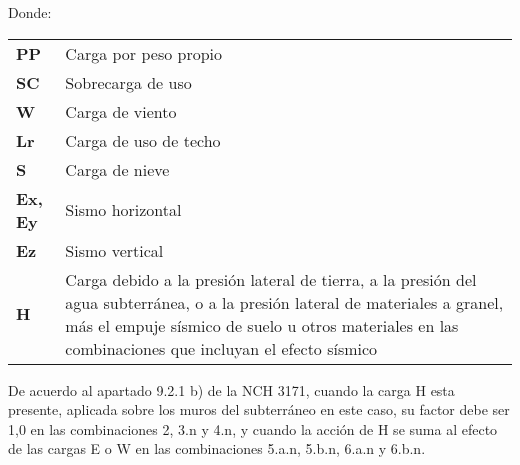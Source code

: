  
Donde:

\begin{table}[H]
  \centering
    \begin{tabular}{lp{12cm}}
    \textbf{PP} & Carga por peso propio \\
    \textbf{SC} & Sobrecarga de uso \\
    \textbf{W} & Carga de viento \\
    \textbf{Lr} & Carga de uso de techo \\
    \textbf{S} & Carga de nieve \\
    \textbf{Ex, Ey} & Sismo horizontal \\
    \textbf{Ez} & Sismo vertical \\
    \textbf{H} & Carga debido a la presión lateral de tierra, a la presión del agua subterránea, o a la presión lateral de materiales a granel, más el empuje sísmico de suelo u otros materiales en las combinaciones que incluyan el efecto sísmico \\
    \end{tabular}%
\end{table}%

De acuerdo al apartado 9.2.1 b) de la NCH 3171, cuando la carga H esta presente, aplicada sobre los muros del subterráneo en este caso, su factor debe ser 1,0 en las combinaciones 2, 3.n y 4.n, y cuando la acción de H se suma al efecto de las cargas E o W en las combinaciones 5.a.n, 5.b.n, 6.a.n y 6.b.n.